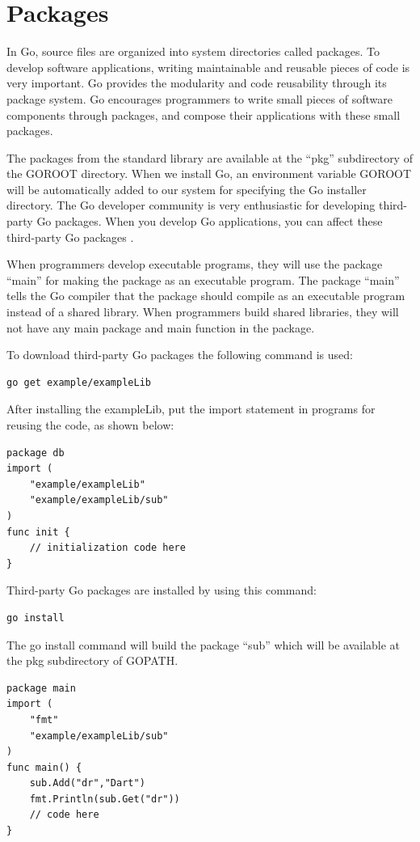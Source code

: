\documentclass[
  digital, %
  notable,   %
  lof,     %
  lot,     %
]{fithesis3}
\begin{document}
\section{Packages}
In Go, source files are organized into system directories called packages. To  develop 
software applications, writing maintainable and reusable pieces of code is very important. Go 
provides the modularity and code reusability through its package system. Go encourages 
programmers to write small pieces of software components through packages, and compose their  
applications with these small packages.

The packages from the standard library are available at the “pkg” subdirectory of the GOROOT 
directory. When we install Go, an environment variable GOROOT will be automatically added to 
our system for specifying the Go installer directory. The Go developer community is very 
enthusiastic for developing third-party Go packages. When you develop Go applications, you can 
affect these third-party Go packages \cite{stack_2014}.

When programmers develop executable programs, they will use the package “main” for making the 
package as an executable program. The package “main” tells the Go compiler that the package 
should compile as an executable program instead of a shared library. When programmers build 
shared libraries, they will not have any main package and main function in the package.

To download third-party Go packages the following command is used: 
\begin{lstlisting}
go get example/exampleLib
\end{lstlisting}
After installing the exampleLib, put the import statement in programs for reusing the code, as 
shown below:
\begin{lstlisting}
package db
import (
	"example/exampleLib"
	"example/exampleLib/sub"
)
func init {
	// initialization code here    
}
\end{lstlisting}
Third-party Go packages are installed by using this command: 
\begin{lstlisting}
go install
\end{lstlisting}
The go install command will build the package “sub” which will be available at the pkg 
subdirectory of GOPATH.
\begin{lstlisting}
package main
import (
	"fmt"
	"example/exampleLib/sub"
)
func main() {
    sub.Add("dr","Dart")
    fmt.Println(sub.Get("dr"))
    // code here    
}
\end{lstlisting}
\end{document}
